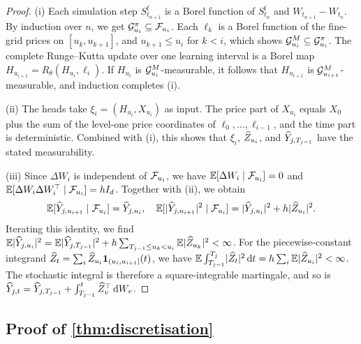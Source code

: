 \begin{proof}

(i) Each simulation step $S^{\mathrm f}_{t_{n+1}}$ is a Borel function of $S^{\mathrm f}_{t_n}$ and $W_{t_{n+1}}-W_{t_n}$. By induction over $n$, we get $\mathcal{G}^{\pi}_{u_i}\subseteq\mathcal{F}_{u_i}$. Each $\ell_k$ is a Borel function of the fine-grid prices on $[u_k,u_{k+1}]$, and $u_{k+1}\le u_i$ for $k<i$, which shows $\mathcal{G}^{M}_{u_i}\subseteq\mathcal{G}^{\pi}_{u_i}$. The complete Runge--Kutta update over one learning interval is a Borel map $H_{u_{i+1}}=R_\theta(H_{u_i},\ell_i)$. If $H_{u_i}$ is $\mathcal{G}^{M}_{u_i}$-measurable, it follows that $H_{u_{i+1}}$ is $\mathcal{G}^{M}_{u_{i+1}}$-measurable, and induction completes (i).

(ii) The heads take $\xi_i=(H_{u_i},X_{u_i})$ as input. The price part of $X_{u_i}$ equals $X_0$ plus the sum of the level-one price coordinates of $\ell_0,\dots,\ell_{i-1}$, and the time part is deterministic. Combined with (i), this shows that $\xi_i$, $\widehat Z_{u_i}$, and $\widehat Y_{j,T_{j-1}}$ have the stated measurability.

(iii) Since $\Delta W_i$ is independent of $\mathcal{F}_{u_i}$, we have $\mathbb{E}[\Delta W_i\mid\mathcal{F}_{u_i}]=0$ and $\mathbb{E}[\Delta W_i\Delta W_i^\top\mid\mathcal{F}_{u_i}]=hI_d$. Together with (ii), we obtain
\[
\mathbb{E}[\widehat Y_{j,u_{i+1}}\mid\mathcal{F}_{u_i}]=\widehat Y_{j,u_i},\quad
\mathbb{E}[\lvert \widehat Y_{j,u_{i+1}}\rvert^2\mid\mathcal{F}_{u_i}]=\lvert \widehat Y_{j,u_i}\rvert^2+h\lvert \widehat Z_{u_i}\rvert^2 .
\]
Iterating this identity, we find $\mathbb{E}\lvert \widehat Y_{j,u_i}\rvert^2=\mathbb{E}\lvert \widehat Y_{j,T_{j-1}}\rvert^2+h\sum_{T_{j-1}\le u_k<u_i}\mathbb{E}\lvert \widehat Z_{u_k}\rvert^2<\infty$. For the piecewise-constant integrand $\widehat Z_t=\sum_i\widehat Z_{u_i}\mathbf{1}_{(u_i,u_{i+1}]}(t)$, we have $\mathbb{E}\int_{T_{j-1}}^{T_j}\lvert \widehat Z_t\rvert^2\,\mathrm{d} t=h\sum_i\mathbb{E}\lvert \widehat Z_{u_i}\rvert^2<\infty$. The stochastic integral is therefore a square-integrable martingale, and so is $\widehat Y_{j,t}=\widehat Y_{j,T_{j-1}}+\int_{T_{j-1}}^t\widehat Z_v^\top\,\mathrm{d} W_v$.
\end{proof}

\subsection{Proof of \texorpdfstring{\cref{thm:discretisation}}{Theorem 4}}\label{app:discretisation}

